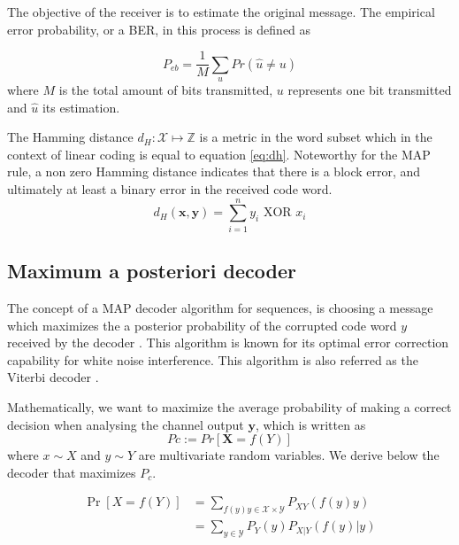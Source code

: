 \documentclass[conference]{IEEEtran}
\begin{document}
The objective of the receiver is to estimate the original message. The empirical error probability, or a BER, in this process is defined as

\begin{equation}
P_{eb} = \frac{1}{M} \underset{u}{\sum}Pr(\hat{u}\neq u)
\end{equation}
where $M$ is the total amount of bits transmitted, $u$ represents one bit transmitted and $\hat{u}$ its estimation.

The Hamming distance $d_H:\mathcal{X}\mapsto \mathbb{Z}$ is a metric in the word subset which in the context of linear coding is equal to equation \ref{eq:dh}. Noteworthy for the MAP rule, a non zero Hamming distance indicates that there is a block error, and ultimately at least a binary error in the received code word.
\begin{equation}\label{eq:dh}
d_H(\textbf{x},\textbf{y}) = \sum_{i=1}^{n} y_i \text{ XOR } x_i 
\end{equation}  


\subsection{Maximum a posteriori decoder}


The concept of a MAP decoder algorithm for sequences, is choosing a message which maximizes the a posterior probability of the corrupted code word $y$ received by the decoder \cite{Worm00turbo-decodingwithout}. This algorithm is known for its optimal error correction capability for white noise interference. This algorithm is also referred as the Viterbi decoder \cite{Viterbi}.

Mathematically, we want to maximize the average probability of making a correct decision when analysing the channel output $\textbf{y}$, which is written as
\begin{equation}\label{eq:MAP1}
Pc := Pr[\textbf{X}=f({Y})]
\end{equation}
where $x \sim X$ and $y \sim Y$ are multivariate random variables. We derive below the decoder that maximizes $P_c$.

\begin{align} 
\Pr \left[ X=f\left( Y\right) \right]& =\sum_{f\left( y\right) y\in \mathcal{X}\times \mathcal{Y}} P_{XY}(f(y)y) \label{eq:MAP2} \\
&=\sum _{y\in \mathcal{Y}}P_{Y}\left( y\right)P_{X|Y}\left( f(y)|y\right) \label{eq:MAP3}
\end{align}
\end{document}
